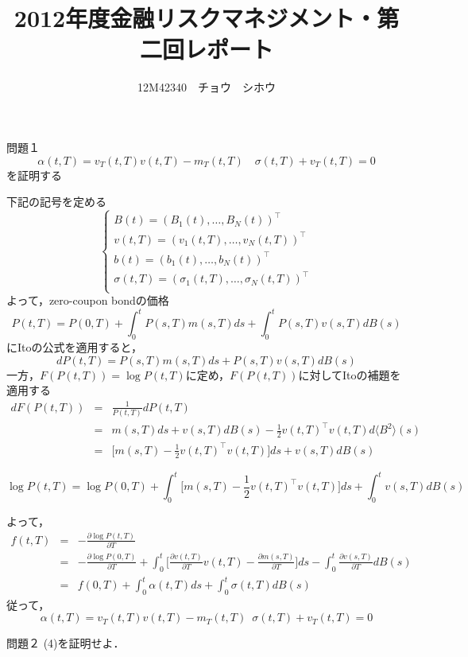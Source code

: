 \documentclass[a4paper,11pt]{jsarticle}
\title{2012年度金融リスクマネジメント・第二回レポート}
\author{12M42340　チョウ　シホウ}
\date{}
\numberwithin{theorem}{section}  %
\numberwithin{equation}{section} %
\begin{document}
{}
\renewcommand{\thepart}{\arabic{part}}

\maketitle
\begin{itembox}[l]{問題１}
\[
\alpha (t,T) = v_T(t,T)v(t,T)-m_T(t,T)\,\,\,\,\,\,
\sigma(t,T) + v_T(t,T) = 0
\]を証明する
\end{itembox}
下記の記号を定める
\[
\begin{cases}
B(t)=(B_1(t),\dots,B_N(t))^\intercal \\
v(t,T)=(v_1(t,T),\dots,v_N(t,T))^\intercal \\
b(t)=(b_1(t),\dots,b_N(t))^\intercal \\
\sigma(t,T) = (\sigma_1(t,T),\dots,\sigma_N(t,T))^\intercal\\
\end{cases}
\]
よって，zero-coupon bondの価格
\[
P(t,T) = P(0,T) + \int_0^t P(s,T)m(s,T)ds + \int_0^t P(s,T)v(s,T)dB(s)
\]にItoの公式を適用すると，
\[
d P(t,T) = P(s,T)m(s,T)ds + P(s,T)v(s,T)dB(s)
\]
一方，$F(P(t,T))=\log P(t,T)$に定め，$F(P(t,T))$に対してItoの補題を適用する
\begin{eqnarray*}
dF( P(t,T))
&=& \frac{1}{P(t,T)} dP(t,T)\\
&=& m(s,T)ds +  v(s,T)dB(s) - \frac{1}{2}v(t,T)^\intercal v(t,T) d\langle B^2\rangle(s) \\
&=& \Bigr[ m(s,T) - \frac{1}{2}v(t,T)^\intercal v(t,T) \Bigr] ds + v(s,T)dB(s)
\end{eqnarray*}

\[
\log P(t,T) = \log P(0,T) + \int_0^t\Bigr[ m(s,T) - \frac{1}{2}v(t,T)^\intercal v(t,T) \Bigr] ds + \int_0^t v(s,T)dB(s)
\]

よって，
\begin{eqnarray*}
f(t,T) &=& - \frac{\partial \log P(t,T)}{\partial T}\\
&=&  - \frac{\partial \log P(0,T)}{\partial T} + \int_0^t  \Bigr[\frac{\partial v(t,T)}{\partial T} v(t,T) -\frac{\partial m(s,T)}{\partial T}\Bigr] ds -  \int_0^t \frac{\partial v(s,T)}{\partial T} d B(s)\\
&=& f(0,T)+ \int_0^t \alpha(t,T) ds + \int_0^t \sigma(t,T) dB(s)
\end{eqnarray*}
従って，
\[
\alpha (t,T) = v_T(t,T)v(t,T)-m_T(t,T)\,\,\, \sigma(t,T) + v_T(t,T) = 0
\]


\begin{itembox}[l]{問題２}
(4)を証明せよ．
\end{itembox}
\end{document}
